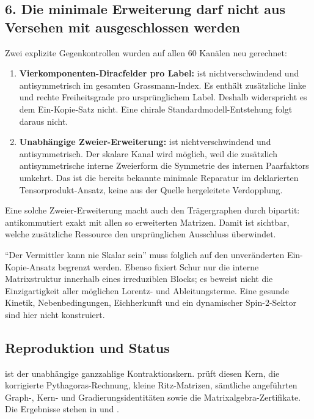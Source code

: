 \subsection{6. Die minimale Erweiterung darf nicht aus Versehen mit
ausgeschlossen
werden}\label{die-minimale-erweiterung-darf-nicht-aus-versehen-mit-ausgeschlossen-werden}

Zwei explizite Gegenkontrollen wurden auf allen 60 Kanälen neu
gerechnet:

\begin{enumerate}
\def\labelenumi{\arabic{enumi}.}
\tightlist
\item
  \textbf{Vierkomponenten-Diracfelder pro Label:} 
  ist nichtverschwindend und antisymmetrisch im gesamten
  Grassmann-Index. Es enthält zusätzliche linke und rechte
  Freiheitsgrade pro ursprünglichem Label. Deshalb widerspricht es dem
  Ein-Kopie-Satz nicht. Eine chirale Standardmodell-Entstehung folgt
  daraus nicht.
\item
  \textbf{Unabhängige Zweier-Erweiterung:}
   ist nichtverschwindend und
  antisymmetrisch. Der skalare Kanal wird möglich, weil die zusätzlich
  antisymmetrische interne Zweierform die Symmetrie des internen
  Paarfaktors umkehrt. Das ist die bereits bekannte minimale Reparatur
  im deklarierten Tensorprodukt-Ansatz, keine aus der Quelle
  hergeleitete Verdopplung.
\end{enumerate}

Eine solche Zweier-Erweiterung macht auch den Trägergraphen durch
 bipartit: 
antikommutiert exakt mit allen so erweiterten Matrizen. Damit ist
sichtbar, welche zusätzliche Ressource den ursprünglichen Ausschluss
überwindet.

``Der Vermittler kann nie Skalar sein'' muss folglich auf den
unveränderten Ein-Kopie-Ansatz begrenzt werden. Ebenso fixiert Schur nur
die interne Matrixstruktur innerhalb eines irreduziblen Blocks; es
beweist nicht die Einzigartigkeit aller möglichen Lorentz- und
Ableitungsterme. Eine gesunde Kinetik, Nebenbedingungen, Eichherkunft
und ein dynamischer Spin-2-Sektor sind hier nicht konstruiert.

\subsection{Reproduktion und Status}\label{reproduktion-und-status}

 ist der unabhängige ganzzahlige
Kontraktionskern.  prüft diesen Kern, die
korrigierte Pythagoras-Rechnung, kleine Ritz-Matrizen, sämtliche
angeführten Graph-, Kern- und Gradierungsidentitäten sowie die
Matrixalgebra-Zertifikate. Die Ergebnisse stehen in
 und .


